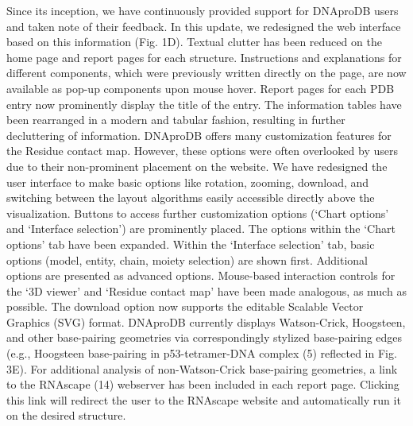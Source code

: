 Since its inception, we have continuously provided support for DNAproDB users and taken note of their feedback. In this update, we redesigned the web interface based on this information (Fig. 1D). Textual clutter has been reduced on the home page and report pages for each structure. Instructions and explanations for different components, which were previously written directly on the page, are now available as pop-up components upon mouse hover. Report pages for each PDB entry now prominently display the title of the entry. The information tables have been rearranged in a modern and tabular fashion, resulting in further decluttering of information. 
DNAproDB offers many customization features for the Residue contact map. However, these options were often overlooked by users due to their non-prominent placement on the website. We have redesigned the user interface to make basic options like rotation, zooming, download, and switching between the layout algorithms easily accessible directly above the visualization. Buttons to access further customization options (‘Chart options’ and ‘Interface selection’) are prominently placed. The options within the ‘Chart options’ tab have been expanded. Within the ‘Interface selection’ tab, basic options (model, entity, chain, moiety selection) are shown first. Additional options are presented as advanced options. Mouse-based interaction controls for the ‘3D viewer’ and ‘Residue contact map’ have been made analogous, as much as possible.
The download option now supports the editable Scalable Vector Graphics (SVG) format. DNAproDB currently displays Watson-Crick, Hoogsteen, and other base-pairing geometries via correspondingly stylized base-pairing edges (e.g., Hoogsteen base-pairing in p53-tetramer-DNA complex (5) reflected in Fig. 3E). For additional analysis of non-Watson-Crick base-pairing geometries, a link to the RNAscape (14) webserver has been included in each report page. Clicking this link will redirect the user to the RNAscape website and automatically run it on the desired structure.

